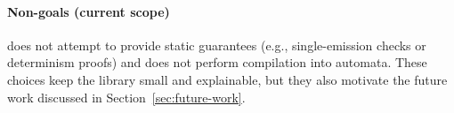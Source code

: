 \paragraph{Non-goals (current scope)}
\tempo{} does not attempt to provide static guarantees (e.g., single-emission
checks or determinism proofs) and does not perform compilation into automata.
These choices keep the library small and explainable, but they also motivate
the future work discussed in Section~\ref{sec:future-work}.
